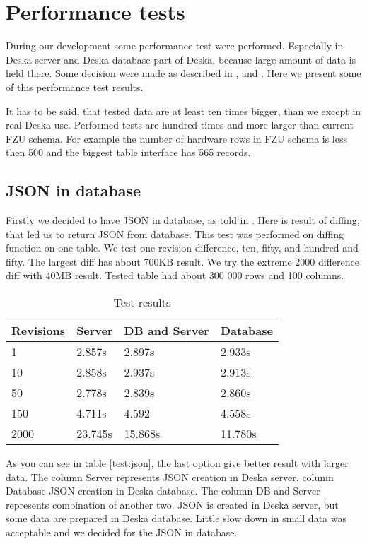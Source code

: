 \documentclass[deska]{subfiles}
\begin{document}
\section{Performance tests}
\label{sec:performance}

During our development some performance test were performed. Especially in Deska server and Deska database
part of Deska, because large amount of data is held there. Some decision were made as described in
,  and .
Here we present some of this performance test results.

It has to be said, that tested data are at least ten times bigger, than we
except in real Deska use. Performed tests are hundred times and more larger
than current FZU schema.
For example the number of hardware rows in FZU schema is less then 500 
and the biggest table interface has 565 records.

\subsection{JSON in database}
\label{sec:test-json}
Firstly we decided to have JSON in database, as told in .
Here is result of diffing, that led us to
return JSON from database.
This test was performed on diffing function on one table.
We test one revision difference, ten, fifty, and hundred and fifty.
The largest diff has about 700KB result.
We try the extreme 2000 difference diff with 40MB result.
Tested table had about 300 000 rows and 100 columns.

\label{test:json}
\begin{longtable}{ l | l | l | l}
\caption{Test results} \\
Revisions & Server & DB and Server & Database \\
\hline
\endhead
1 & 2.857s & 2.897s & 2.933s \\
10 & 2.858s & 2.937s & 2.913s \\
50 & 2.778s & 2.839s & 2.860s \\
150 & 4.711s & 4.592 & 4.558s \\
2000 & 23.745s & 15.868s & 11.780s \\
\end{longtable}

As you can see in table \ref{test:json}, the last option give better result with larger data.
The column Server represents JSON creation in Deska server, column Database JSON creation in
Deska database. The column DB and Server represents combination of another two. JSON is created
in Deska server, but some data are prepared in Deska database.
Little slow down in small data was acceptable and we decided for the JSON in database.
\end{document}
